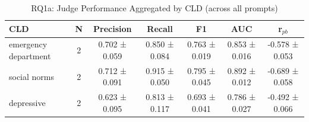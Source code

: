 \begin{table}[htbp]
\centering
\caption{RQ1a: Judge Performance Aggregated by CLD (across all prompts)}
\label{tab:rq1a_by_cld}
\begin{tabular}{lcccccc}
\toprule
\textbf{CLD} & \textbf{N} & \textbf{Precision} & \textbf{Recall} & \textbf{F1} & \textbf{AUC} & \textbf{r$_{pb}$} \\
\midrule
emergency department & 2 & 0.702 ± 0.059 & 0.850 ± 0.084 & 0.763 ± 0.019 & 0.853 ± 0.016 & -0.578 ± 0.053 \\
social norms & 2 & 0.712 ± 0.091 & 0.915 ± 0.050 & 0.795 ± 0.045 & 0.892 ± 0.012 & -0.689 ± 0.058 \\
depressive & 2 & 0.623 ± 0.095 & 0.813 ± 0.117 & 0.693 ± 0.041 & 0.786 ± 0.027 & -0.492 ± 0.066 \\
\bottomrule
\end{tabular}
\end{table}